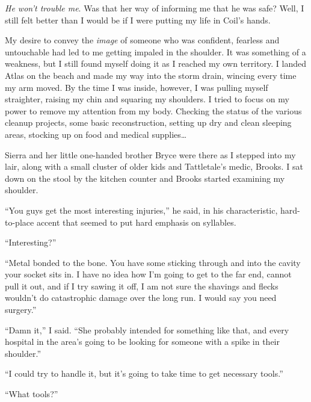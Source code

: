 \emph{He won't trouble me}.  Was that her way of informing me that he was safe?  Well, I still felt better than I would be if I were putting my life in Coil's hands.



My desire to convey the \emph{image} of someone who was confident, fearless and untouchable had led to me getting impaled in the shoulder.  It was something of a weakness, but I still found myself doing it as I reached my own territory.  I landed Atlas on the beach and made my way into the storm drain, wincing every time my arm moved.  By the time I was inside, however, I was pulling myself straighter, raising my chin and squaring my shoulders.  I tried to focus on my power to remove my attention from my body.  Checking the status of the various cleanup projects, some basic reconstruction, setting up dry and clean sleeping areas, stocking up on food and medical supplies\ldots



Sierra and her little one-handed brother Bryce were there as I stepped into my lair, along with a small cluster of older kids and Tattletale's medic, Brooks.  I sat down on the stool by the kitchen counter and Brooks started examining my shoulder.



``You guys get the most interesting injuries,'' he said, in his characteristic, hard-to-place accent that seemed to put hard emphasis on syllables.



``Interesting?''



``Metal bonded to the bone.  You have some sticking through and into the cavity your socket sits in.  I have no idea how I'm going to get to the far end, cannot pull it out, and if I try sawing it off, I am not sure the shavings and flecks wouldn't do catastrophic damage over the long run.  I would say you need surgery.''



``Damn it,'' I said.  ``She probably intended for something like that, and every hospital in the area's going to be looking for someone with a spike in their shoulder.''



``I could try to handle it, but it's going to take time to get necessary tools.''



``What tools?''



